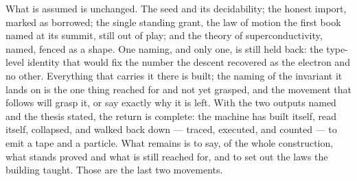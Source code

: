 What is assumed is unchanged. The seed and its decidability; the honest import, marked as borrowed; the
single standing grant, the law of motion the first book named at its summit, still out of play; and the
theory of superconductivity, named, fenced as a shape. One naming, and only one, is still held back: the
type-level identity that would fix the number the descent recovered as the electron and no other. Everything
that carries it there is built; the naming of the invariant it lands on is the one thing reached for and not
yet grasped, and the movement that follows will grasp it, or say exactly why it is left. With the two outputs
named and the thesis stated, the return is complete: the machine has built itself, read itself, collapsed,
and walked back down --- traced, executed, and counted --- to emit a tape and a particle. What remains is to
say, of the whole construction, what stands proved and what is still reached for, and to set out the laws the
building taught. Those are the last two movements.
